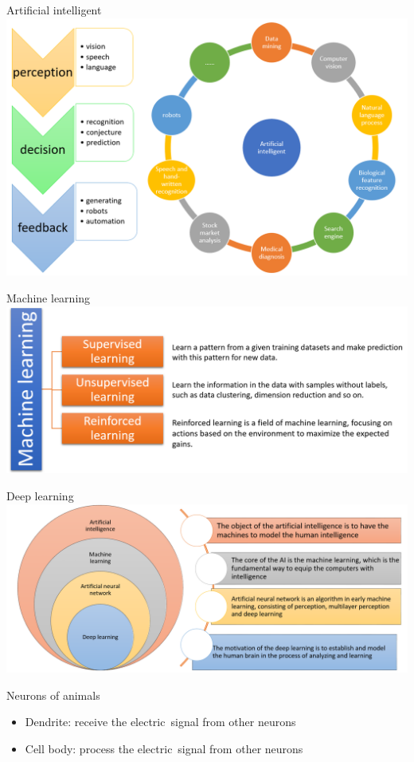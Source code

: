 \documentclass{beamer}
\begin{document}
\begin{CJK*}{UTF8}{gbsn}
\begin{frame}{Artificial intelligent}
\centering  
\includegraphics[width=.8\textwidth]{figures/AI}
\end{frame}


\begin{frame}{Machine learning}
\centering  
\includegraphics[width=.8\textwidth]{figures/ML}
\end{frame}


\begin{frame}{Deep learning}
\centering  
\includegraphics[width=.8\textwidth]{figures/DL}
\end{frame}


\begin{frame}{Neurons of animals}

\begin{itemize}
\item Dendrite: receive the electric signal from other neurons

\item Cell body: process the electric signal from other neurons


\end{itemize}
\end{frame}
\end{CJK*}
\end{document}
